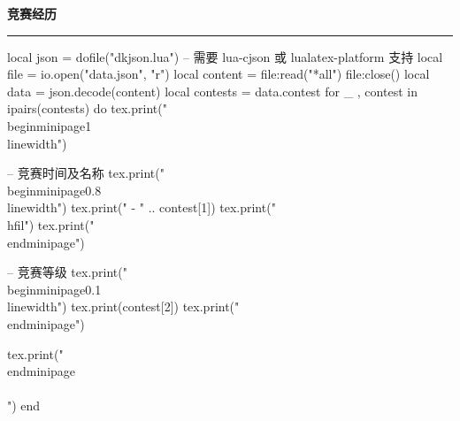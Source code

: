 \documentclass[10pt, a4paper, oneside]{ctexart}
\begin{document}
\ifdefined\contest
\begin{minipage}{1\textwidth}
    \large{\textbf{竞赛经历}}
\end{minipage}
\rule{\linewidth}{\lineSize}
\begin{center}
    \begin{minipage}{0.9\textwidth}
        \begin{luacode}
            local json = dofile("dkjson.lua")  -- 需要 lua-cjson 或 lualatex-platform 支持
            local file = io.open("data.json", "r")
            local content = file:read("*all")
            file:close()
            local data = json.decode(content)
            local contests = data.contest
            for _ , contest in ipairs(contests) do
                tex.print("\\begin{minipage}{1\\linewidth}")

                -- 竞赛时间及名称
                tex.print("\\begin{minipage}{0.8\\linewidth}")
                tex.print(" - " .. contest[1])
                tex.print("\\hfil")
                tex.print("\\end{minipage}")

                -- 竞赛等级
                tex.print("\\begin{minipage}{0.1\\linewidth}")
                tex.print(contest[2])
                tex.print("\\end{minipage}")

                tex.print("\\end{minipage}\\\\[0.5em]")
            end
        \end{luacode}
    \end{minipage}
\end{center}
\fi
\end{document}

